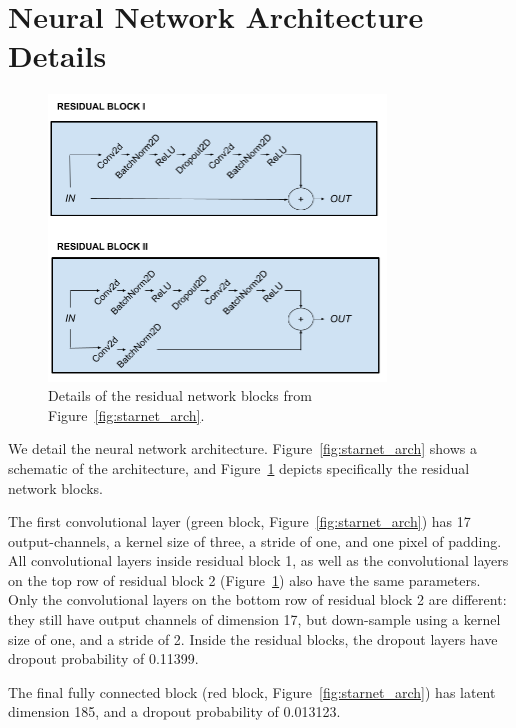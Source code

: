 \section{Neural Network Architecture Details}
\label{sec:supp_nn_architecture}

\begin{figure}[!tb]
    \centering
    \includegraphics[width=0.8\textwidth]{figures/vi_figures/conv_block.png}
    \caption{Details of the residual network blocks from Figure~\ref{fig:starnet_arch}.
    }
    \label{fig:conv_blocks}
\end{figure}


We detail the neural network architecture. 
Figure~\ref{fig:starnet_arch} shows a schematic of the architecture, and 
Figure~\ref{fig:conv_blocks} depicts specifically 
the residual network blocks. 

The first convolutional layer (green block, Figure~\ref{fig:starnet_arch}) has 17 output-channels, a kernel size of three, a stride of one, and one pixel of padding.
All convolutional layers inside residual block 1, as well as the convolutional layers on the top row of residual block 2 (Figure~\ref{fig:conv_blocks}) also have the same parameters. 
Only the convolutional layers on the bottom row of residual block 2 are different: they still have output channels of dimension 17, 
but down-sample using a kernel size of one, and a stride of 2. 
Inside the residual blocks, the dropout layers have dropout probability of 0.11399. 

The final fully connected block (red block, Figure~\ref{fig:starnet_arch}) has latent dimension 185, and a dropout probability of 0.013123. 

